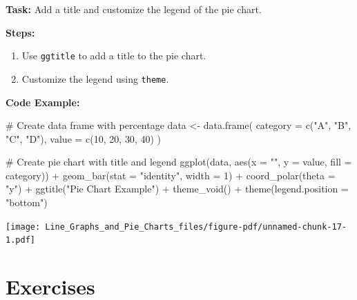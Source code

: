 \documentclass[
  letterpaper,
  DIV=11,
  numbers=noendperiod]{scrreprt}
\newenvironment{Shaded}{\begin{snugshade}}{\end{snugshade}}
\newcommand{\AttributeTok}[1]{\textcolor[rgb]{0.40,0.45,0.13}{#1}}
\newcommand{\CommentTok}[1]{\textcolor[rgb]{0.37,0.37,0.37}{#1}}
\newcommand{\DecValTok}[1]{\textcolor[rgb]{0.68,0.00,0.00}{#1}}
\newcommand{\FunctionTok}[1]{\textcolor[rgb]{0.28,0.35,0.67}{#1}}
\newcommand{\NormalTok}[1]{\textcolor[rgb]{0.00,0.23,0.31}{#1}}
\newcommand{\OtherTok}[1]{\textcolor[rgb]{0.00,0.23,0.31}{#1}}
\newcommand{\SpecialCharTok}[1]{\textcolor[rgb]{0.37,0.37,0.37}{#1}}
\newcommand{\StringTok}[1]{\textcolor[rgb]{0.13,0.47,0.30}{#1}}
\providecommand{\tightlist}{%
  \setlength{\itemsep}{0pt}\setlength{\parskip}{0pt}}\usepackage{longtable,booktabs,array}
\begin{document}
\textbf{Task:} Add a title and customize the legend of the pie chart.

\textbf{Steps:}

\begin{enumerate}
\def\labelenumi{\arabic{enumi}.}
\tightlist
\item
  Use \texttt{ggtitle} to add a title to the pie chart.
\item
  Customize the legend using \texttt{theme}.
\end{enumerate}

\textbf{Code Example:}

\begin{Shaded}
\begin{Highlighting}[]
\CommentTok{\# Create data frame with percentage}
\NormalTok{data }\OtherTok{\textless{}{-}} \FunctionTok{data.frame}\NormalTok{(}
  \AttributeTok{category =} \FunctionTok{c}\NormalTok{(}\StringTok{"A"}\NormalTok{, }\StringTok{"B"}\NormalTok{, }\StringTok{"C"}\NormalTok{, }\StringTok{"D"}\NormalTok{),}
  \AttributeTok{value =} \FunctionTok{c}\NormalTok{(}\DecValTok{10}\NormalTok{, }\DecValTok{20}\NormalTok{, }\DecValTok{30}\NormalTok{, }\DecValTok{40}\NormalTok{)}
\NormalTok{)}

\CommentTok{\# Create pie chart with title and legend}
\FunctionTok{ggplot}\NormalTok{(data, }\FunctionTok{aes}\NormalTok{(}\AttributeTok{x =} \StringTok{""}\NormalTok{, }\AttributeTok{y =}\NormalTok{ value, }\AttributeTok{fill =}\NormalTok{ category)) }\SpecialCharTok{+}
  \FunctionTok{geom\_bar}\NormalTok{(}\AttributeTok{stat =} \StringTok{"identity"}\NormalTok{, }\AttributeTok{width =} \DecValTok{1}\NormalTok{) }\SpecialCharTok{+}
  \FunctionTok{coord\_polar}\NormalTok{(}\AttributeTok{theta =} \StringTok{"y"}\NormalTok{) }\SpecialCharTok{+}
  \FunctionTok{ggtitle}\NormalTok{(}\StringTok{"Pie Chart Example"}\NormalTok{) }\SpecialCharTok{+}
  \FunctionTok{theme\_void}\NormalTok{() }\SpecialCharTok{+}
  \FunctionTok{theme}\NormalTok{(}\AttributeTok{legend.position =} \StringTok{"bottom"}\NormalTok{)}
\end{Highlighting}
\end{Shaded}

\texttt{[image: Line\_Graphs\_and\_Pie\_Charts\_files/figure-pdf/unnamed-chunk-17-1.pdf]}

\section*{Exercises}\label{exercises-4}
\end{document}
